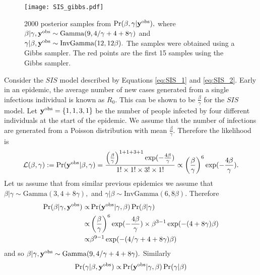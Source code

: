 \begin{figure}[htbp]
    \centering
    \texttt{[image: SIS\_gibbs.pdf]}
    \caption{
        2000 posterior samples from $\Pr(\beta, \gamma | \mathbf{y}^{\mathrm{obs}}),$ where
        $\beta|\gamma, \mathbf{y}^{\mathrm{obs}}
            \sim \mathrm{Gamma}(9, 4/\gamma + 4 + 8\gamma)$ and
        $\gamma|\beta, \mathbf{y}^{\mathrm{obs}}
            \sim \mathrm{InvGamma}(12, 12\beta).$ The samples were
        obtained using a Gibbs sampler.
        The red points are the first 15 samples using the Gibbs sampler.
    }
    \label{fig:gibbs_R}
\end{figure}

\begin{example}
    Consider the $SIS$ model described by Equations \ref{eq:SIS_1}
    and \ref{eq:SIS_2}. Early in an epidemic, the average number of new
    cases generated from a single infectious individual is known as $R_0.$
    This can be shown to be $\frac{\beta}{\gamma}$ for the $SIS$ model.
    Let $\mathbf{y}^{\mathrm{obs}} = \{1, 1, 3, 1\}$ be the number of people infected by four
    different individuals at the start of the epidemic. We assume that the
    number of infections are generated from a Poisson distribution with mean
    $\frac{\beta}{\gamma}.$ Therefore the likelihood is
    $$
        \mathcal{L}(\beta, \gamma):= \Pr(\mathbf{y}^{\mathrm{obs}} | \beta, \gamma)
        = \frac{
            \left(\frac{\beta}{\gamma}\right)^{1 + 1 + 3 + 1}
            \exp( -\frac{4\beta}{\gamma})
        }{
            1!\times 1! \times 3! \times 1!
        }
        \propto\left(\frac{\beta}{\gamma}\right)^{6}\exp( -\frac{4\beta}{\gamma}).
    $$
    Let us assume that from similar previous epidemics we assume that
    $\beta | \gamma \sim \mathrm{Gamma}(3, 4 + 8\gamma),$ and
    $\gamma | \beta \sim \mathrm{InvGamma}(6, 8\beta).$ Therefore
    \begin{align*}
        \Pr(\beta|\gamma, \mathbf{y}^{\mathrm{obs}})
        \propto & \Pr(\mathbf{y}^{\mathrm{obs}}|\gamma, \beta)\Pr(\beta|\gamma)      \\
        \propto &
        \left(\frac{\beta}{\gamma}\right)^{6}
        \exp( -\frac{4\beta}{\gamma})
        \times \beta^{3 - 1}\exp(-(4 + 8\gamma)\beta)               \\
        \propto & \beta^{9 - 1}\exp(-(4/\gamma + 4 + 8\gamma)\beta)
    \end{align*}
    and so
    $\beta|\gamma, \mathbf{y}^{\mathrm{obs}}
        \sim \mathrm{Gamma}(9, 4/\gamma + 4 + 8\gamma).$
    Similarly
    \begin{align*}
        \Pr(\gamma|\beta, \by^\obs)
        \propto & \Pr(\by^\obs|\gamma, \beta)\Pr(\gamma|\beta)         \\

\end{align*}
\end{example}

